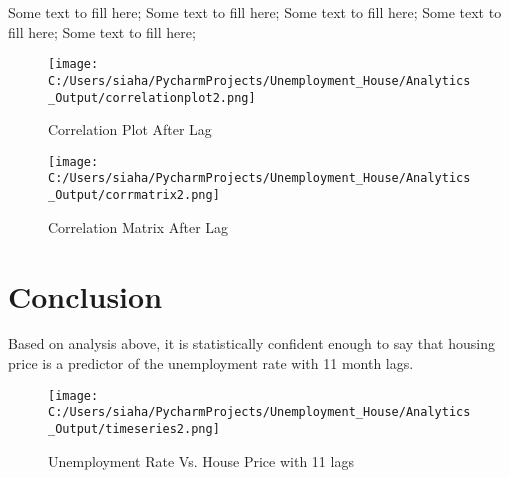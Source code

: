 \documentclass[twocolumn,12pt]{article}
\begin{document}
Some text to fill here; Some text to fill here; Some text to fill here; Some text to fill here; Some text to fill here; 

\begin{figure*}[h!]
\centering
\texttt{[image: C:/Users/siaha/PycharmProjects/Unemployment\_House/Analytics\_Output/correlationplot2.png]}
\caption{Correlation Plot After Lag}
\end{figure*}

\begin{figure*}[h!]
\centering
\texttt{[image: C:/Users/siaha/PycharmProjects/Unemployment\_House/Analytics\_Output/corrmatrix2.png]}
\caption{Correlation Matrix After Lag}
\end{figure*}

\section*{\textcolor{indigo(dye)}{Conclusion}}
Based on analysis above, it is statistically confident enough to say that housing price is a predictor of the unemployment rate with 11 month lags.

\begin{figure*}[h!]
\centering
\texttt{[image: C:/Users/siaha/PycharmProjects/Unemployment\_House/Analytics\_Output/timeseries2.png]}
\caption{Unemployment Rate Vs. House Price with 11 lags}
\end{figure*}
\end{document}
